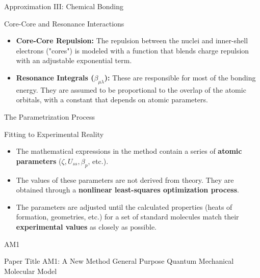 \begin{frame}{Approximation III: Chemical Bonding}
    \begin{block}{Core-Core and Resonance Interactions}
        \begin{itemize}
            \item \textbf{Core-Core Repulsion:} The repulsion between the nuclei and inner-shell electrons ("cores") is modeled with a function that blends charge repulsion with an adjustable exponential term.
            \pause
            \bigskip
            \item \textbf{Resonance Integrals ($\beta_{\mu\lambda}$):} These are responsible for most of the bonding energy. They are assumed to be proportional to the overlap of the atomic orbitals, with a constant that depends on atomic parameters.
        \end{itemize}
    \end{block}
\end{frame}



\begin{frame}{The Parametrization Process}
    \begin{block}{Fitting to Experimental Reality}
        \begin{itemize}
            \item The mathematical expressions in the method contain a series of \textbf{atomic parameters} ($\zeta, U_{ss}, \beta_p$, etc.).
            \pause
            \bigskip
            \item The values of these parameters are not derived from theory. They are obtained through a \textbf{nonlinear least-squares optimization process}.
            \pause
            \bigskip
            \item The parameters are adjusted until the calculated properties (heats of formation, geometries, etc.) for a set of standard molecules match their \textbf{experimental values} as closely as possible.
        \end{itemize}
    \end{block}
\end{frame}


\begin{frame}{AM1}
	\begin{block}{Paper Title}
	AM1: A New Method General Purpose Quantum Mechanical Molecular Model
	\end{block}
\end{frame}

